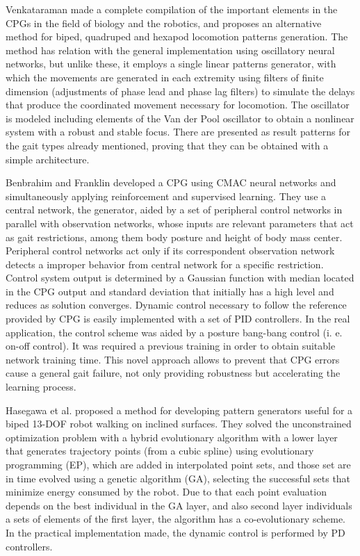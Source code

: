 Venkataraman \cite{Venkataraman97simple} made a complete compilation
of the important elements in the CPGs in the field of biology and the
robotics, and proposes an alternative method for biped, quadruped and
hexapod locomotion patterns generation. The method has relation with
the general implementation using oscillatory neural networks, but
unlike these, it employs a single linear patterns generator, with
which the movements are generated in each extremity using filters of
finite dimension (adjustments of phase lead and phase lag filters) to
simulate the delays that produce the coordinated movement necessary
for locomotion. The oscillator is modeled including elements of the
Van der Pool oscillator to obtain a nonlinear system with a robust and
stable focus. There are presented as result patterns for the gait
types already mentioned, proving that they can be obtained with a
simple architecture.


Benbrahim and Franklin \cite{Benbrahim97Biped} developed a CPG using
CMAC neural networks and simultaneously applying reinforcement and
supervised learning. They use a central network, the generator, aided
by a set of peripheral control networks in parallel with observation
networks, whose inputs are relevant parameters that act as gait
restrictions, among them body posture and height of body mass
center. Peripheral control networks act only if its correspondent
observation network detects a improper behavior from central network
for a specific restriction. Control system output is determined by a
Gaussian function with median located in the CPG output and standard
deviation that initially has a high level and reduces as solution
converges. Dynamic control necessary to follow the reference provided
by CPG is easily implemented with a set of PID controllers. In the
real application, the control scheme was aided by a posture bang-bang
control (i. e. on-off control). It was required a previous training in
order to obtain suitable network training time. This novel approach
allows to prevent that CPG errors cause a general gait failure, not
only providing robustness but accelerating the learning process.


Hasegawa et al. \cite{Hasegawa00Trajectory} proposed a method for
developing pattern generators useful for a biped 13-DOF robot walking
on inclined surfaces. They solved the unconstrained optimization
problem with a hybrid evolutionary algorithm with a lower layer that
generates trajectory points (from a cubic spline) using evolutionary
programming (EP), which are added in interpolated point sets, and
those set are in time evolved using a genetic algorithm (GA),
selecting the successful sets that minimize energy consumed by the
robot. Due to that each point evaluation depends on the best
individual in the GA layer, and also second layer individuals a sets
of elements of the first layer, the algorithm has a co-evolutionary
scheme. In the practical implementation made, the dynamic control is
performed by PD controllers.


